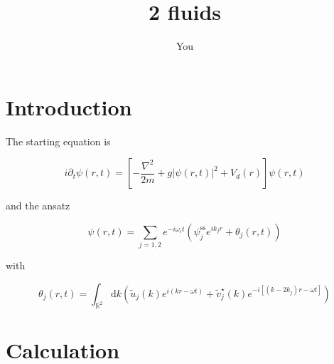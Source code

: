 \documentclass[12pt]{article}
\title{2 fluids}
\author{You}
\begin{document}


\section{Introduction}

The starting equation is

\begin{equation}
i\partial_{t}\psi(r,t)=\left[-\frac{\nabla^{2}}{2m}+g\left|\psi(r,t)\right|^{2}+V_{d}(r)\right]\psi(r,t)
\end{equation}

and the ansatz


\begin{equation}
\psi(r,t)=\sum_{j=1,2}e^{-i \omega_i t}(\psi^\text{ss}_je^{i k_j r}+\theta_j(r,t))
\end{equation}

with

\begin{equation}
\theta_j(r,t)=\int_{\mathbb{R}^{2}}\mathrm{d}k \left(\tilde{u}_j(k) e^{i (k  r - \omega t)}+\tilde{v}_j^{\star}(k) e^{-i \left[(k-2 k_j) r -\omega t\right] }\right)
\end{equation}


\section{Calculation}
\label{sec:examples}




\end{document}
